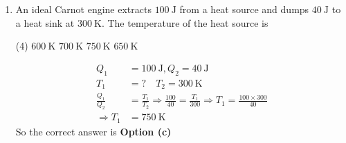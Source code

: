 \begin{enumerate}
\begin{tasks}
	\task[\textbf{a.}]zero
	\task[\textbf{b.}] $\alpha\left(T_{f}-T_{i}\right)+\frac{\alpha}{2 T_{f}}\left(T_{f}-T_{i}\right)^{2}$
	\task[\textbf{c.}] $\alpha\left(T_{f}-T_{i}\right)$
	\task[\textbf{d.}]$\alpha\left(T_{f}-T_{i}\right)+\frac{\alpha}{2 T_{f}}\left(T_{f}^{2}-T_{i}^{2}\right)$
\end{tasks}
\begin{answer}
	\begin{align*}
	\text{Change in entropy of gas}\\
	T d s&=C_{V} d T+P d V, \mathrm{dV}=0 \\
	T d s&=\alpha T d T \\
	\Delta s_{g a s}&=\alpha\left[T_{f}-T_{i}\right]\\
	\text{Change in entropy of reservoir }&\text{(at constant temperature $T_f$)}\\
	T_{f} d s&=\alpha T d T \qquad d Q=\alpha T d T\\
	T_{f} \Delta s_{\mathrm{Res}}&=\left.\alpha \frac{T^{2}}{2}\right|_{T_{i}} ^{T_{f}}=\frac{\alpha}{2}\left[T_{f}^{2}-T_{i}^{2}\right] \\
	\Delta s_{\mathrm{Res}}&=\frac{\alpha}{2 T_{f}}\left[T_{f}^{2}-T_{i}^{2}\right], \quad \Delta s_{\text {total }}=\alpha\left[T_{f}-T_{i}\right]+\frac{\alpha}{2 T_{f}}\left[T_{f}^{2}-T_{i}^{2}\right]
	\end{align*}
		So the correct answer is \textbf{Option (d)}
\end{answer}
\item An ideal Carnot engine extracts $100 \mathrm{~J}$ from a heat source and dumps $40 \mathrm{~J}$ to a heat sink at $300 \mathrm{~K}$. The temperature of the heat source is
 \begin{tasks}(4)
	\task[\textbf{a.}]$600 \mathrm{~K}$
	\task[\textbf{b.}]$700 \mathrm{~K}$
	\task[\textbf{c.}] $750 \mathrm{~K}$
	\task[\textbf{d.}] $650 \mathrm{~K}$
\end{tasks}
\begin{answer}
	\begin{align*}
	Q_{1}&=100 \mathrm{~J}, Q_{2}=40 \mathrm{~J}\\
	T_{1}&=? \quad T_{2}=300 \mathrm{~K} \\
	\frac{Q_{1}}{Q_{2}}&=\frac{T_{1}}{T_{2}} \Rightarrow \frac{100}{40}=\frac{T_{1}}{300} \Rightarrow T_{1}=\frac{100 \times 300}{40} \\
	\Rightarrow T_{1}&=750 \mathrm{~K}
	\end{align*}
		So the correct answer is \textbf{Option (c)}
\end{answer}

\end{enumerate}
